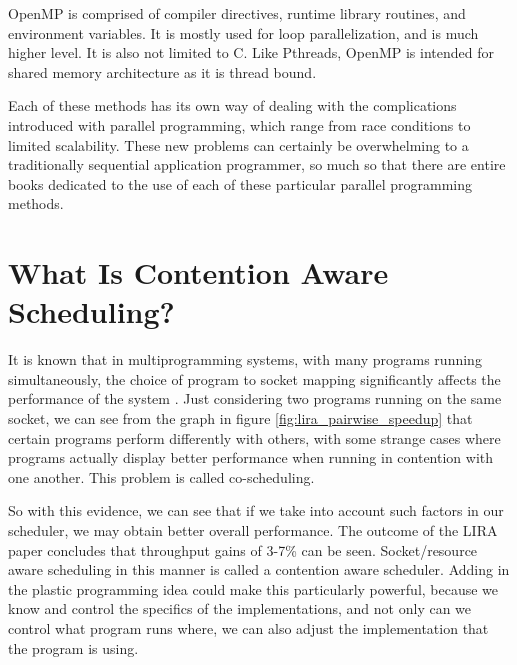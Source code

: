 OpenMP is comprised of compiler directives, runtime library routines, and environment variables. It is mostly used for loop parallelization, and is much higher level. It is also not limited to C. Like Pthreads, OpenMP is intended for shared memory architecture as it is thread bound.

Each of these methods has its own way of dealing with the complications introduced with parallel programming, which range from race conditions to limited scalability. These new problems can certainly be overwhelming to a traditionally sequential application programmer, so much so that there are entire books dedicated to the use of each of these particular parallel programming methods. 



\section{What Is Contention Aware Scheduling?}

It is known that in multiprogramming systems, with many programs running simultaneously, the choice of program to socket mapping significantly affects the performance of the system \cite{lira}. Just considering two programs running on the same socket, we can see from the graph in figure \ref{fig:lira_pairwise_speedup} that certain programs perform differently with others, with some strange cases where programs actually display better performance when running in contention with one another. This problem is called co-scheduling.

So with this evidence, we can see that if we take into account such factors in our scheduler, we may obtain better overall performance. The outcome of the LIRA paper concludes that throughput gains of 3-7\% can be seen. Socket/resource aware scheduling in this manner is called a contention aware scheduler. Adding in the plastic programming idea could make this particularly powerful, because we know and control the specifics of the implementations, and not only can we control what program runs where, we can also adjust the implementation that the program is using.


